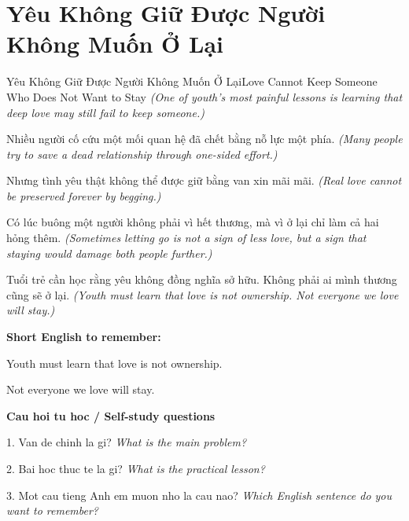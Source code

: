 \section{Yêu Không Giữ Được Người Không Muốn Ở Lại}
\begin{truyen}{Yêu Không Giữ Được Người Không Muốn Ở Lại}{Love Cannot Keep Someone Who Does Not Want to Stay}
\textit{(One of youth’s most painful lessons is learning that deep love may still fail to keep someone.)}

Nhiều người cố cứu một mối quan hệ đã chết bằng nỗ lực một phía.
\textit{(Many people try to save a dead relationship through one-sided effort.)}

Nhưng tình yêu thật không thể được giữ bằng van xin mãi mãi.
\textit{(Real love cannot be preserved forever by begging.)}

Có lúc buông một người không phải vì hết thương, mà vì ở lại chỉ làm cả hai hỏng thêm.
\textit{(Sometimes letting go is not a sign of less love, but a sign that staying would damage both people further.)}

\end{truyen}

\begin{baihoc}
Tuổi trẻ cần học rằng yêu không đồng nghĩa sở hữu. Không phải ai mình thương cũng sẽ ở lại.
\textit{(Youth must learn that love is not ownership. Not everyone we love will stay.)}
\end{baihoc}

\begin{ghinhoanh}
\textbf{Short English to remember:}

Youth must learn that love is not ownership.

Not everyone we love will stay.

\end{ghinhoanh}

\begin{tuhocnhanh}
\textbf{Cau hoi tu hoc / Self-study questions}

1. Van de chinh la gi? \textit{What is the main problem?}

2. Bai hoc thuc te la gi? \textit{What is the practical lesson?}

3. Mot cau tieng Anh em muon nho la cau nao? \textit{Which English sentence do you want to remember?}
\end{tuhocnhanh}
\ngancach

